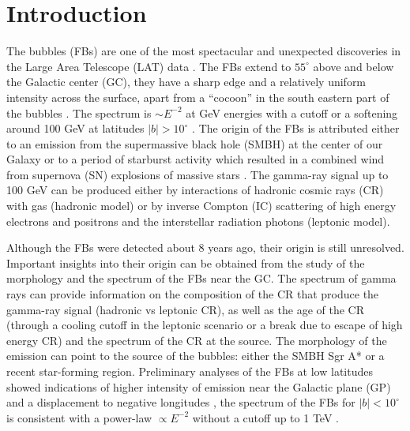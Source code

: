\section{Introduction}



The \Fermi bubbles (FBs) are one of the most spectacular and unexpected discoveries 
in the \Fermi Large Area Telescope (LAT) data \citep{2010ApJ...724.1044S}.
The FBs extend to $55^\circ$ above and below the Galactic center (GC),
they have a sharp edge and a relatively uniform intensity across the surface, apart from a ``cocoon'' in the south eastern part of the bubbles
\citep{2012ApJ...753...61S, 2014ApJ...793...64A}.
The spectrum is $\sim E^{-2}$ at GeV energies with a cutoff or a softening around 100 GeV at latitudes $|b| > 10^\circ$ \citep{2014ApJ...793...64A}.
The origin of the FBs is attributed either to an emission from the supermassive black hole (SMBH) at
the center of our Galaxy %
or to a period of starburst activity which resulted in a combined wind
from supernova (SN) explosions of massive stars %
\citep[for a review see][]{2010ApJ...711..818S}.
The gamma-ray signal up to 100 GeV can be produced either by interactions of hadronic cosmic rays (CR) with gas (hadronic model)
or by inverse Compton (IC) scattering of high energy electrons and positrons and the interstellar radiation photons (leptonic model).

Although the FBs were detected about 8 years ago, their origin is still unresolved.
Important insights into their origin can be obtained from the study of the morphology and the spectrum of the FBs near the GC.
The spectrum of gamma rays can provide information on the composition of the 
CR that produce the gamma-ray signal (hadronic vs leptonic CR),
as well as the age of the CR (through a cooling cutoff in the leptonic scenario or a break due to escape of high energy CR)
and the spectrum of the CR at the source.
The morphology of the emission can point to the source of the bubbles: either the SMBH Sgr A* or a recent star-forming region.
Preliminary analyses of the FBs at low latitudes showed indications of higher intensity of emission near the Galactic plane (GP) and a displacement
to negative longitudes \citep{2016ApJS..223...26A, 2017ApJ...840...43A, 2017JCAP...08..022S},
the spectrum of the FBs for $|b| < 10^\circ$ is consistent with a power-law $\propto E^{-2}$ 
without a cutoff up to 1 TeV \citep{2017ApJ...840...43A}.

